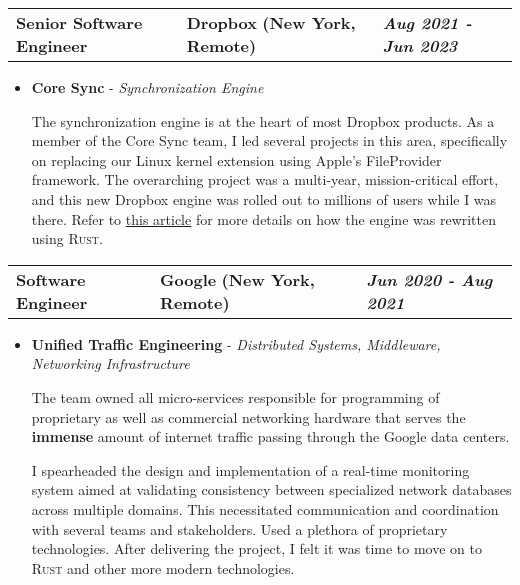\documentclass[a4paper,10pt]{article}
\newcommand*{\mahogany}{\textcolor{darkmahogany}}
\newcommand{\jobtitle}[4]{
\vspace{0.3cm}
\begin{tabularx}
{\textwidth}
{ >{\raggedright\arraybackslash}p{6.5cm}
  >{\raggedright\arraybackslash}X
  >{\raggedleft\arraybackslash}p{4cm} }
\fontsize{13pt}{15pt}\selectfont\textbf{#1} &

\large\textbf{\mahogany{#2}} \normalsize\textbf{(#3)} &
\textit{\large\textbf{#4}}
\end{tabularx}
\vspace{-0.4cm}
}
\begin{document}
\jobtitle{Senior Software Engineer}{Dropbox}{New York, Remote}{Aug 2021 - Jun 2023}
\begin{itemize}[leftmargin=.27in,label=] \setlength\itemsep{-0.1cm}
	\item \textbf{Core Sync} - \textit{Synchronization Engine}

    The synchronization engine is at the heart of most Dropbox products. As a member of the Core Sync team, I led several projects in this area,
    specifically on replacing our Linux kernel extension using Apple's FileProvider framework.
    The overarching project was a multi-year, mission-critical effort,
    and this new Dropbox engine was rolled out to millions of users while I was there.
    Refer to \href{https://dropbox.tech/infrastructure/rewriting-the-heart-of-our-sync-engine}{this article}
    for more details on how the engine was rewritten using \textsc{Rust}.
\end{itemize}

\jobtitle{Software Engineer}{Google}{New York, Remote}{Jun 2020 - Aug 2021}
\begin{itemize}[leftmargin=.27in,label=] \setlength\itemsep{-0.1cm}
	\item \textbf{Unified Traffic Engineering} - \textit{Distributed Systems, Middleware, Networking Infrastructure}

The team owned all micro-services responsible for programming of proprietary as well as commercial networking hardware that serves the \textbf{immense} amount of internet traffic passing through the Google data centers.

I spearheaded the design and implementation of a real-time monitoring system aimed at validating consistency between specialized network databases across multiple domains. This necessitated communication and coordination with several teams and stakeholders. Used a plethora of proprietary technologies. After delivering the project, I felt it was time to move on to \textsc{Rust} and other more modern technologies.
\end{itemize}
\end{document}
